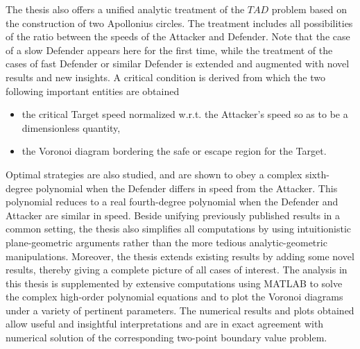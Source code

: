 The thesis also offers a unified analytic treatment of the $TAD$ problem based on the construction of two Apollonius circles.
The treatment includes all possibilities of the ratio between the speeds of the Attacker and Defender. Note that the case of a slow Defender appears here for the first time, while the treatment of the cases of fast Defender or similar Defender is extended and augmented with novel results and new insights. A critical condition is derived from which the two following important entities are obtained
\begin{itemize}
\item the critical Target speed normalized w.r.t. the Attacker's speed so as to be a dimensionless quantity,
\item the Voronoi diagram bordering the safe or escape region for the Target.
\end{itemize}

Optimal strategies are also studied, and are shown to obey a complex sixth-degree polynomial when the Defender differs in speed from the Attacker. This polynomial reduces to a real fourth-degree polynomial when the Defender and Attacker are similar in speed.
Beside unifying previously published results in a common setting, the thesis also simplifies all computations by using intuitionistic plane-geometric arguments rather than the more tedious analytic-geometric manipulations. 
Moreover, the thesis extends existing results by adding some novel results, thereby giving a complete picture of all cases of interest.
The analysis in this thesis is supplemented by extensive computations using MATLAB to solve the complex high-order polynomial equations and to plot the Voronoi diagrams under a variety of pertinent parameters. The numerical results and plots obtained allow useful and insightful interpretations and are in exact agreement with numerical solution of the corresponding two-point boundary value problem.

\bigskip 


